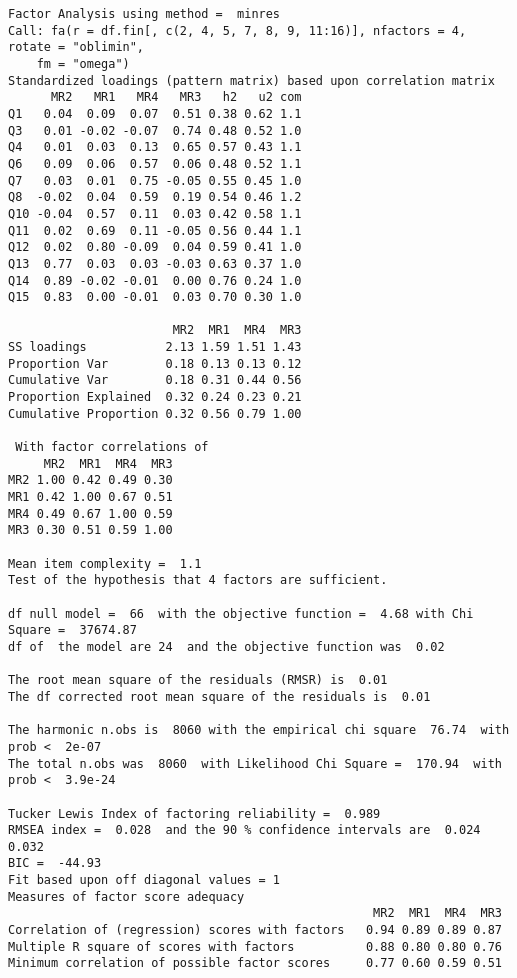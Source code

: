 \documentclass[
  letterpaper,
  DIV=11,
  numbers=noendperiod]{scrartcl}
\begin{document}
\begin{verbatim}
Factor Analysis using method =  minres
Call: fa(r = df.fin[, c(2, 4, 5, 7, 8, 9, 11:16)], nfactors = 4, rotate = "oblimin", 
    fm = "omega")
Standardized loadings (pattern matrix) based upon correlation matrix
      MR2   MR1   MR4   MR3   h2   u2 com
Q1   0.04  0.09  0.07  0.51 0.38 0.62 1.1
Q3   0.01 -0.02 -0.07  0.74 0.48 0.52 1.0
Q4   0.01  0.03  0.13  0.65 0.57 0.43 1.1
Q6   0.09  0.06  0.57  0.06 0.48 0.52 1.1
Q7   0.03  0.01  0.75 -0.05 0.55 0.45 1.0
Q8  -0.02  0.04  0.59  0.19 0.54 0.46 1.2
Q10 -0.04  0.57  0.11  0.03 0.42 0.58 1.1
Q11  0.02  0.69  0.11 -0.05 0.56 0.44 1.1
Q12  0.02  0.80 -0.09  0.04 0.59 0.41 1.0
Q13  0.77  0.03  0.03 -0.03 0.63 0.37 1.0
Q14  0.89 -0.02 -0.01  0.00 0.76 0.24 1.0
Q15  0.83  0.00 -0.01  0.03 0.70 0.30 1.0

                       MR2  MR1  MR4  MR3
SS loadings           2.13 1.59 1.51 1.43
Proportion Var        0.18 0.13 0.13 0.12
Cumulative Var        0.18 0.31 0.44 0.56
Proportion Explained  0.32 0.24 0.23 0.21
Cumulative Proportion 0.32 0.56 0.79 1.00

 With factor correlations of 
     MR2  MR1  MR4  MR3
MR2 1.00 0.42 0.49 0.30
MR1 0.42 1.00 0.67 0.51
MR4 0.49 0.67 1.00 0.59
MR3 0.30 0.51 0.59 1.00

Mean item complexity =  1.1
Test of the hypothesis that 4 factors are sufficient.

df null model =  66  with the objective function =  4.68 with Chi Square =  37674.87
df of  the model are 24  and the objective function was  0.02 

The root mean square of the residuals (RMSR) is  0.01 
The df corrected root mean square of the residuals is  0.01 

The harmonic n.obs is  8060 with the empirical chi square  76.74  with prob <  2e-07 
The total n.obs was  8060  with Likelihood Chi Square =  170.94  with prob <  3.9e-24 

Tucker Lewis Index of factoring reliability =  0.989
RMSEA index =  0.028  and the 90 % confidence intervals are  0.024 0.032
BIC =  -44.93
Fit based upon off diagonal values = 1
Measures of factor score adequacy             
                                                   MR2  MR1  MR4  MR3
Correlation of (regression) scores with factors   0.94 0.89 0.89 0.87
Multiple R square of scores with factors          0.88 0.80 0.80 0.76
Minimum correlation of possible factor scores     0.77 0.60 0.59 0.51
\end{verbatim}
\end{document}
